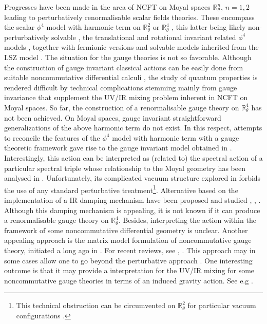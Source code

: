 \documentclass[a4paper,11pt,twoside]{article}
\numberwithin{equation}{section}
\theoremstyle{nonumberplain}
\newcounter{and}
\begin{document}
Progresses have been made in the area of NCFT on Moyal spaces $\mathbb{R}^n_\theta$, $n=1,2$ leading to perturbatively renormalisable scalar fields theories. These encompass the scalar $\phi^4$ model with harmonic term on $\mathbb{R}^2_\theta$ or $\mathbb{R}^4_\theta$ \cite{Grosse:2003aj-pc}, this latter being likely non-perturbatively solvable \cite{harald-raimar}, the translational and rotational invariant related $\phi^4$ models \cite{branqui-1}, \cite{adg-w111} together with fermionic versions \cite{vtw} and solvable models inherited from the LSZ model \cite{LSZ}. The situation for the gauge theories is not so favorable. Although the construction of gauge invariant classical actions can be easily done from suitable noncommutative differential calculi \cite{mdv88-99, cgmw-20}, the study of quantum properties is rendered difficult by technical complications stemming mainly from gauge invariance that supplement the UV/IR mixing problem inherent in NCFT on Moyal spaces. So far, the construction of a renormalisable gauge theory on $\mathbb{R}^4_\theta$ has not been achieved. On Moyal spaces, gauge invariant straightforward generalizations of the above harmonic term do not exist. In this respect, attempts to reconcile the features of the $\phi^4$ model with harmonic term with a gauge theoretic framework gave rise to the gauge invariant model obtained in \cite{Wallet:2007c}. Interestingly, this action can be interpreted as (related to) the spectral action of a particular spectral triple \cite{Grosse:2007jy} whose relationship to the Moyal geometry has been analysed in \cite{Wallet:2011aa}. Unfortunately, its complicated vacuum structure explored in \cite{GWW2} forbids the use of any standard perturbative treatment{\footnote{This technical obstruction can be circumvented on $\mathbb{R}^2_\theta$ for particular vacuum configurations \cite{MVW13}.}}. Alternative based
on the implementation of a IR damping mechanism have been proposed and studied \cite{blaschk1}, \cite{Blaschke:2009c}, \cite{bgw-13}. Although this damping mechanism is appealing, it is not known if it can produce a renormalisable gauge theory on $\mathbb{R}^4_\theta$. Besides, interpreting the action within the framework of some noncommutative differential geometry is unclear. Another appealing approach is the matrix model formulation of noncommutative gauge theory, initiated a long ago in \cite{matrix1}. For recent reviews, see \cite{matrix2}, \cite{matrix3}. This approach may in some cases allow one to go beyond the perturbative approach \cite{matrix4}. One interesting outcome is that it may provide a interpretation for the UV/IR mixing for some noncommutative gauge theories in terms of an induced gravity action. See e.g \cite{matrix5}.\par
\end{document}
